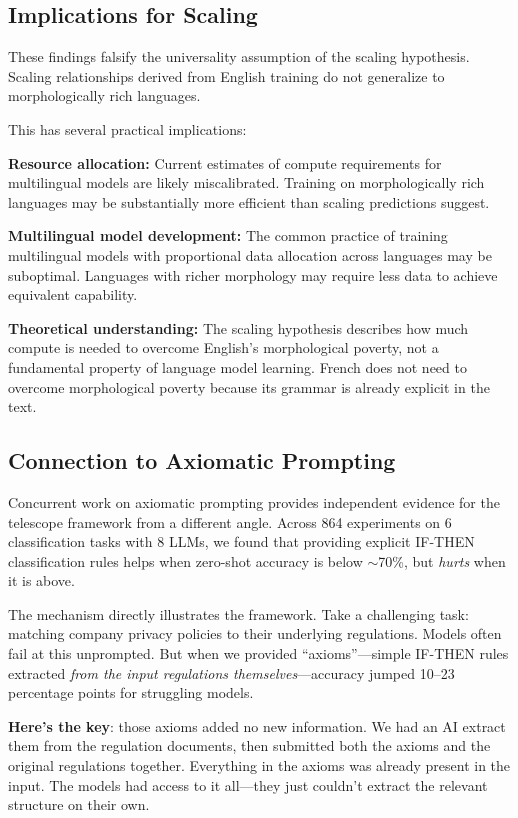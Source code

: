 \documentclass[11pt,a4paper]{article}
\begin{document}
\subsection{Implications for Scaling}

These findings falsify the universality assumption of the scaling hypothesis. Scaling relationships derived from English training do not generalize to morphologically rich languages.

This has several practical implications:

\textbf{Resource allocation:} Current estimates of compute requirements for multilingual models are likely miscalibrated. Training on morphologically rich languages may be substantially more efficient than scaling predictions suggest.

\textbf{Multilingual model development:} The common practice of training multilingual models with proportional data allocation across languages may be suboptimal. Languages with richer morphology may require less data to achieve equivalent capability.

\textbf{Theoretical understanding:} The scaling hypothesis describes how much compute is needed to overcome English's morphological poverty, not a fundamental property of language model learning. French does not need to overcome morphological poverty because its grammar is already explicit in the text.

\subsection{Connection to Axiomatic Prompting}

Concurrent work on axiomatic prompting \citep{wasserman2025axiomatic} provides independent evidence for the telescope framework from a different angle. Across 864 experiments on 6 classification tasks with 8 LLMs, we found that providing explicit IF-THEN classification rules helps when zero-shot accuracy is below $\sim$70\%, but \textit{hurts} when it is above.

The mechanism directly illustrates the framework. Take a challenging task: matching company privacy policies to their underlying regulations. Models often fail at this unprompted. But when we provided ``axioms''---simple IF-THEN rules extracted \textit{from the input regulations themselves}---accuracy jumped 10--23 percentage points for struggling models.

\textbf{Here's the key}: those axioms added no new information. We had an AI extract them from the regulation documents, then submitted both the axioms and the original regulations together. Everything in the axioms was already present in the input. The models had access to it all---they just couldn't extract the relevant structure on their own.
\end{document}
